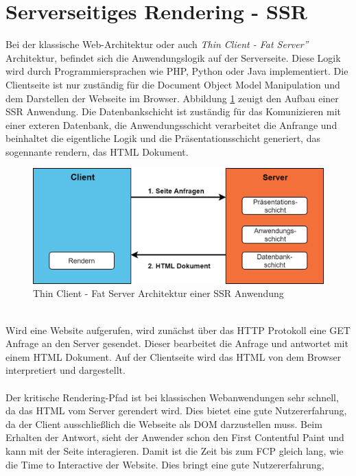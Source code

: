 \documentclass[runningheads]{llncs}
\begin{document}
\section{Serverseitiges Rendering - SSR}
\label{sec:Serverseitiges Rendering}
Bei der klassische Web-Architektur oder auch \textit{Thin Client - Fat Server”} 
Architektur, befindet sich die Anwendungslogik auf der Serverseite. 
Diese Logik wird durch Programmiersprachen wie PHP, Python oder Java 
implementiert. Die Clientseite ist nur zuständig für die Document Object Model 
Manipulation und dem Darstellen der Webseite im Browser. Abbildung \ref{Thin Client - Fat Server Architektur einer SSR Anwendung} 
zeuigt den Aufbau einer SSR Anwendung. Die Datenbankschicht ist zuständig für das Komunizieren mit einer exteren
Datenbank, die Anwendungsschicht verarbeitet die Anfrange und beinhaltet die eigentliche Logik und die Präsentationsschicht generiert,
das sogennante rendern, das HTML Dokument. \cite{IsomorphicApps} \cite{subramanian}
\begin{figure}[h]
  \centering
  \includegraphics[width=12cm]{images/server}
  \caption{Thin Client - Fat Server Architektur einer SSR Anwendung}
  \label{Thin Client - Fat Server Architektur einer SSR Anwendung}
\end{figure}
\\
Wird eine Website aufgerufen, wird zunächst über das HTTP Protokoll 
eine GET Anfrage an den Server gesendet. Dieser bearbeitet die Anfrage 
und antwortet mit einem HTML Dokument. Auf der Clientseite wird das HTML 
von dem Browser interpretiert und dargestellt.
\\
\\
Der kritische Rendering-Pfad ist bei klassischen Webanwendungen sehr schnell, 
da das HTML vom Server gerendert wird. Dies bietet eine gute Nutzererfahrung, 
da der Client ausschließlich die Webseite als DOM darzustellen muss. 
Beim Erhalten der Antwort, sieht der Anwender schon den First Contentful Paint 
und kann mit der Seite interagieren. Damit ist die Zeit bis zum FCP gleich lang, 
wie die Time to Interactive der Website. Dies bringt eine gute Nutzererfahrung, 
\end{document}
